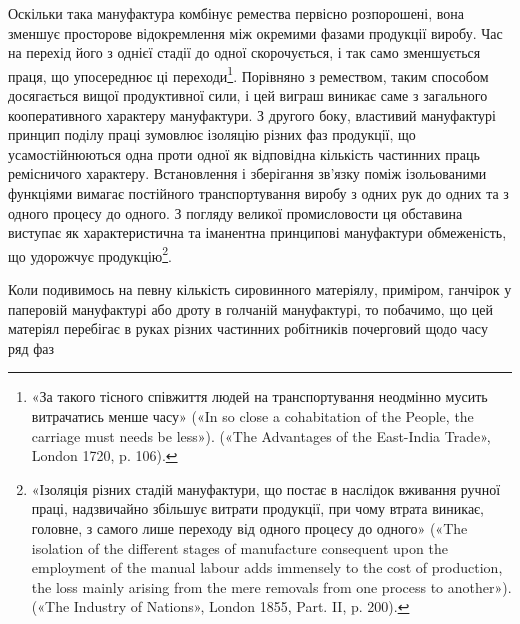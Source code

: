 Оскільки така мануфактура комбінує ремества первісно розпорошені,
вона зменшує просторове відокремлення між окремими
фазами продукції виробу. Час на перехід його з однієї
стадії до одної скорочується, і так само зменшується праця, що
упосереднює ці переходи\footnote{
«За такого тісного співжиття людей на транспортування неодмінно
мусить витрачатись менше часу» («In so close a cohabitation
of the People, the carriage must needs be less»). («The Advantages of the
East-India Trade», London 1720, p. 106).
}. Порівняно з ремеством, таким способом
досягається вищої продуктивної сили, і цей виграш виникає
саме з загального кооперативного характеру мануфактури.
З другого боку, властивий мануфактурі принцип поділу праці
зумовлює ізоляцію різних фаз продукції, що усамостійнюються
одна проти одної як відповідна кількість частинних праць ремісничого
характеру. Встановлення і зберігання зв’язку поміж
ізольованими функціями вимагає постійного транспортування
виробу з одних рук до одних та з одного процесу до одного.
З погляду великої промисловости ця обставина виступає як характеристична
та іманентна принципові мануфактури обмеженість,
що удорожчує продукцію\footnote{
«Ізоляція різних стадій мануфактури, що постає в наслідок вживання
ручної праці, надзвичайно збільшує витрати продукції, при чому
втрата виникає, головне, з самого лише переходу від одного процесу
до одного» («The isolation of the different stages of manufacture consequent
upon the employment of the manual labour adds immensely to
the cost of production, the loss mainly arising from the mere removals from
one process to another»). («The Industry of Nations», London 1855,
Part. II, p. 200).
}.

Коли подивимось на певну кількість сировинного матеріялу,
приміром, ганчірок у паперовій мануфактурі або дроту в голчаній
мануфактурі, то побачимо, що цей матеріял перебігає в руках
різних частинних робітників почерговий щодо часу ряд фаз
\parbreak{}  %
